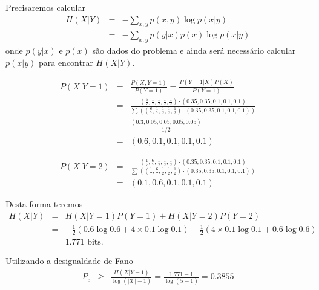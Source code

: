 \begin{frame}[allowframebreaks]
\begin{example}
  \examplebreak

  Precisaremos calcular 
  \begin{eqnarray}
  H(X|Y) &=& - \sum_{x,y} p(x,y) \log p(x|y) \nonumber \\
         &=& - \sum_{x,y} p(y|x) p(x) \log p(x|y)
  \end{eqnarray}
  onde $p(y|x)$ e $p(x)$ são dados do problema e ainda será necessário calcular $p(x|y)$ para encontrar $H(X|Y)$.

  \examplebreak

  \begin{eqnarray}
  P(X|Y=1) &=& \frac{P(X,Y=1)}{P(Y=1)} = \frac{P(Y=1|X)P(X)}{P(Y=1)} \nonumber \\
        &=& \frac{(\frac{6}{7}, \frac{1}{7}, \frac{1}{2}, \frac{1}{2}, \frac{1}{2}) \cdot (0.35, 0.35, 0.1, 0.1, 0.1) }{ \sum \left( (\frac{6}{7}, \frac{1}{7}, \frac{1}{2}, \frac{1}{2}, \frac{1}{2}) \cdot (0.35, 0.35, 0.1, 0.1, 0.1)  \right)  } \nonumber \\
        &=& \frac{(0.3, 0.05, 0.05, 0.05, 0.05)}{1/2} \nonumber \\
        &=& (0.6, 0.1, 0.1, 0.1, 0.1)
  \end{eqnarray}
  
  \examplebreak

  \begin{eqnarray}
  P(X|Y=2) &=& \frac{(\frac{1}{7}, \frac{6}{7}, \frac{1}{2}, \frac{1}{2}, \frac{1}{2}) \cdot (0.35, 0.35, 0.1, 0.1, 0.1) }{ \sum \left( (\frac{1}{7}, \frac{6}{7}, \frac{1}{2}, \frac{1}{2}, \frac{1}{2}) \cdot (0.35, 0.35, 0.1, 0.1, 0.1)  \right)  } \nonumber \\
        &=& (0.1, 0.6, 0.1, 0.1, 0.1)
  \end{eqnarray}

  \examplebreak 
  
  Desta forma teremos
  \begin{eqnarray}
  H(X|Y) &=& H(X|Y=1) P(Y=1) + H(X|Y=2) P(Y=2) \nonumber \\
        &=& - \frac{1}{2} \left( 0.6 \log 0.6 + 4 \times 0.1 \log 0.1 \right) - \frac{1}{2} \left( 4 \times 0.1 \log 0.1 + 0.6 \log 0.6 \right) \nonumber \\
        &=& 1.771 \text{ bits. }
  \end{eqnarray}

  Utilizando a desigualdade de Fano
  \begin{eqnarray}
  P_e &\geq& \frac{H(X|Y - 1)}{\log \left( \vert \mathcal{X} \vert -1 \right)} = \frac{1.771 - 1}{ \log (5-1)} = 0.3855
  \end{eqnarray}

  \end{example}
\end{frame}

